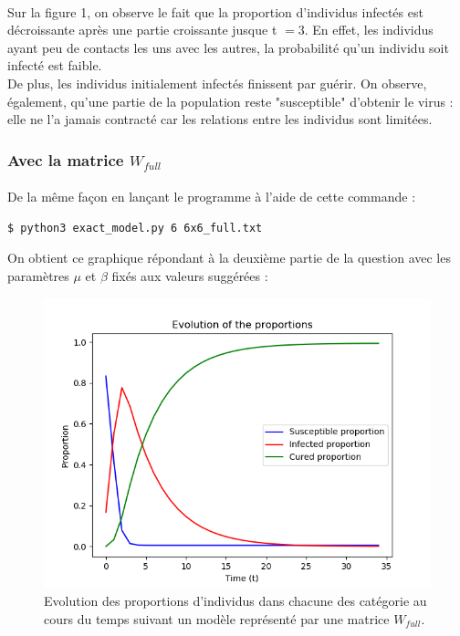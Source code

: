 \documentclass[a4paper, 12pt, oneside]{article}
\begin{document}
\paragraph{}Sur la figure 1, on observe le fait que la proportion d'individus infectés est décroissante après une partie croissante jusque t $= 3$. En effet, les individus ayant peu de contacts les uns avec les autres, la probabilité qu'un individu soit infecté est faible.\\
De plus, les individus initialement infectés finissent par guérir. On observe, également, qu'une partie de la population reste "susceptible" d'obtenir le virus : elle ne l'a jamais contracté car les relations entre les individus sont limitées.

\subsubsection{Avec la matrice $W_{full}$}

\paragraph{}De la même façon en lançant le programme à l'aide de cette commande :
\begin{lstlisting}[language=bash]
$ python3 exact_model.py 6 6x6_full.txt
\end{lstlisting}

\noindent On obtient ce graphique répondant à la deuxième partie de la question avec les paramètres $\mu$ et $\beta$ fixés aux valeurs suggérées : 

\begin{figure}[H]
	\centering
	\includegraphics[scale=1]{full_6x6.png} 
	\caption{Evolution des proportions d'individus dans chacune des catégorie au cours du temps suivant un modèle représenté par une matrice $W_{full}$.}
\end{figure}
\end{document}
